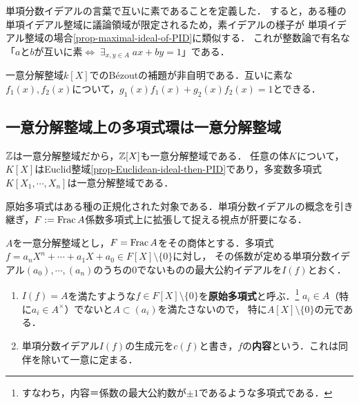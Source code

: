 \documentclass[uplatex,dvipdfmx]{jsreport}
\begin{document}
\begin{remarks}
    単項分数イデアルの言葉で互いに素であることを定義した．
    すると，ある種の単項イデアル整域に議論領域が限定されるため，素イデアルの様子が
    単項イデアル整域の場合\ref{prop-maximal-ideal-of-PID}に類似する．
    これが整数論で有名な「$a$と$b$が互いに素$\Leftrightarrow\;\exists_{x,y\in A}\;ax+by=1$」である．
\end{remarks}
\begin{remark}
    一意分解整域$k[X]$でのBézoutの補題が非自明である．互いに素な$f_1(x),f_2(x)$について，$g_1(x)f_1(x)+g_2(x)f_2(x)=1$とできる．
\end{remark}

\subsection{一意分解整域上の多項式環は一意分解整域}

\begin{tcolorbox}[colframe=ForestGreen, colback=ForestGreen!10!white,breakable,colbacktitle=ForestGreen!40!white,coltitle=black,fonttitle=\bfseries\sffamily,
title=一意分解整域上の$n$変数多項式環は一意分解整域である]
    $\mathbb{Z}$は一意分解整域だから，$\mathbb{Z}[X]$も一意分解整域である．
    任意の体$K$について，$K[X]$はEuclid整域\ref{prop-Euclidean-ideal-then-PID}であり，多変数多項式$K[X_1,\cdots,X_n]$は一意分解整域である．
    
    原始多項式はある種の正規化された対象である．単項分数イデアルの概念を引き継ぎ，$F:=\mathrm{Frac}\, A$係数多項式上に拡張して捉える視点が肝要になる．
\end{tcolorbox}

\begin{definition}
    $A$を一意分解整域とし，$F=\mathrm{Frac}\, A$をその商体とする．多項式$f=a_nX^n+\cdots+a_1X+a_0\in F[X]\setminus\{0\}$に対し，
    その係数が定める単項分数イデアル$(a_0),\cdots,(a_n)$のうちの$0$でないものの最大公約イデアルを$I(f)$とおく．
    \begin{enumerate}
        \item $I(f)=A$を満たすような$f\in F[X]\setminus\{0\}$を\textbf{原始多項式}と呼ぶ．\footnote{すなわち，内容＝係数の最大公約数が$\pm 1$であるような多項式である．}
        $a_i\in A$（特に$a_i\in A^\times$）でないと$A\subset(a_i)$を満たさないので，
        特に$A[X]\setminus\{0\}$の元である．
        \item 単項分数イデアル$I(f)$の生成元を$c(f)$と書き，$f$の\textbf{内容}という．これは同伴を除いて一意に定まる．
    \end{enumerate}
\end{definition}
\end{document}
